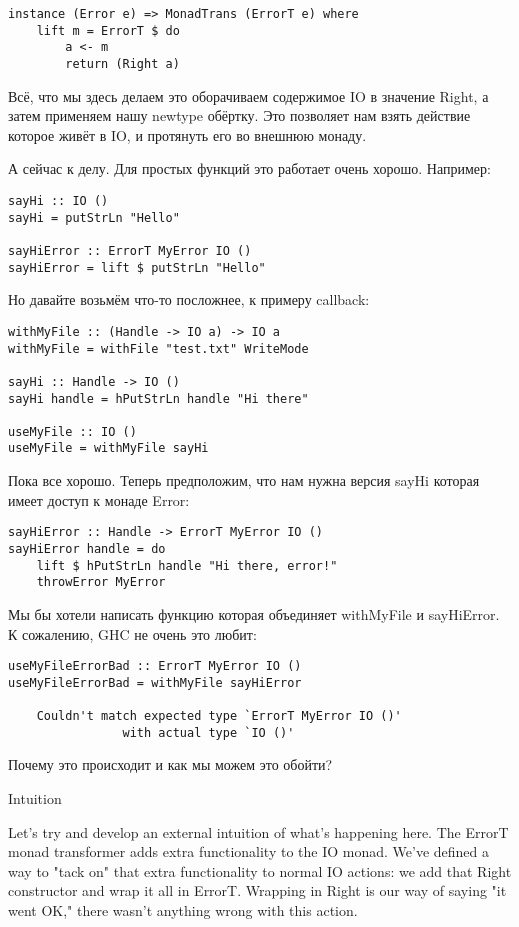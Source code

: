 \begin{lstlisting}
instance (Error e) => MonadTrans (ErrorT e) where
    lift m = ErrorT $ do
        a <- m
        return (Right a)
\end{lstlisting}

Всё, что мы здесь делаем это оборачиваем содержимое IO в значение Right, а затем применяем нашу newtype обёртку. Это позволяет нам взять действие которое живёт в IO, и протянуть его во внешнюю монаду.

А сейчас к делу. Для простых функций это работает очень хорошо. Например:

\begin{lstlisting}
sayHi :: IO ()
sayHi = putStrLn "Hello"

sayHiError :: ErrorT MyError IO ()
sayHiError = lift $ putStrLn "Hello"
\end{lstlisting}

Но давайте возьмём что-то посложнее, к примеру callback:

\begin{lstlisting}
withMyFile :: (Handle -> IO a) -> IO a
withMyFile = withFile "test.txt" WriteMode

sayHi :: Handle -> IO ()
sayHi handle = hPutStrLn handle "Hi there"

useMyFile :: IO ()
useMyFile = withMyFile sayHi
\end{lstlisting}

Пока все хорошо. Теперь предположим, что нам нужна версия sayHi которая имеет доступ к монаде Error:

\begin{lstlisting}
sayHiError :: Handle -> ErrorT MyError IO ()
sayHiError handle = do
    lift $ hPutStrLn handle "Hi there, error!"
    throwError MyError
\end{lstlisting}

Мы бы хотели написать функцию которая объединяет withMyFile и sayHiError. К сожалению, GHC не очень это любит:

\begin{lstlisting}
useMyFileErrorBad :: ErrorT MyError IO ()
useMyFileErrorBad = withMyFile sayHiError

    Couldn't match expected type `ErrorT MyError IO ()'
                with actual type `IO ()'
\end{lstlisting}

Почему это происходит и как мы можем это обойти?

Intuition

Let's try and develop an external intuition of what's happening here. The ErrorT monad transformer adds extra functionality to the IO monad. We've defined a way to "tack on" that extra functionality to normal IO actions: we add that Right constructor and wrap it all in ErrorT. Wrapping in Right is our way of saying "it went OK," there wasn't anything wrong with this action.

